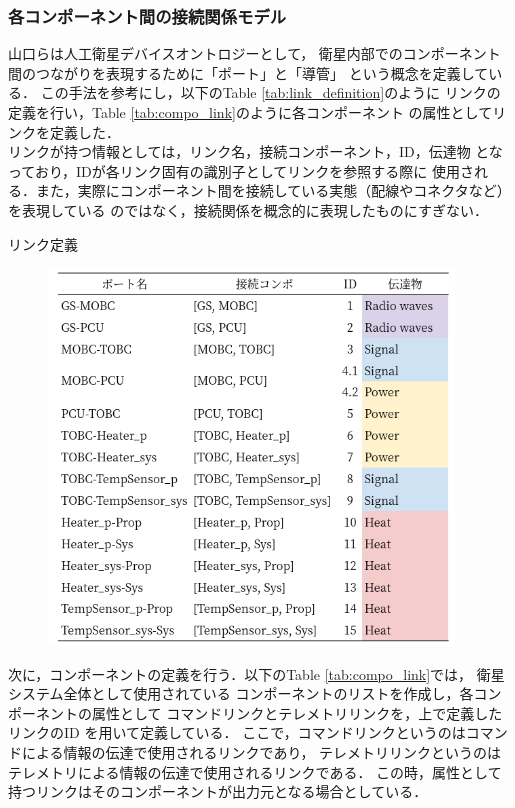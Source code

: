 \documentclass[11pt]{article}
\begin{document}
\subsubsection{各コンポーネント間の接続関係モデル}
山口ら\cite{Yamaguchi2014}は人工衛星デバイスオントロジーとして，
衛星内部でのコンポーネント間のつながりを表現するために「ポート」と「導管」%
という概念を定義している．
この手法を参考にし，以下のTable \ref{tab:link_definition}のように
リンクの定義を行い，Table \ref{tab:compo_link}のように各コンポーネント
の属性としてリンクを定義した．\\
リンクが持つ情報としては，リンク名，接続コンポーネント，ID，伝達物
となっており，IDが各リンク固有の識別子としてリンクを参照する際に
使用される．また，実際にコンポーネント間を接続している実態（配線やコネクタなど）を表現している
のではなく，接続関係を概念的に表現したものにすぎない．

\newpage
\begin{table}[H]
   \centering
   \caption{リンク定義} 
   \label{tab:link_definition}
\end{table} 
\vspace{-2zh}
\begin{figure}[H]
   \centering
      \includegraphics[height=10cm]{figure/port_definition.png}
\end{figure}
次に，コンポーネントの定義を行う．以下のTable \ref{tab:compo_link}では，
衛星システム全体として使用されている
コンポーネントのリストを作成し，各コンポーネントの属性として
コマンドリンクとテレメトリリンクを，上で定義したリンクのID
を用いて定義している．
ここで，コマンドリンクというのはコマンドによる情報の伝達で使用されるリンクであり，
テレメトリリンクというのはテレメトリによる情報の伝達で使用されるリンクである．
この時，属性として持つリンクはそのコンポーネントが出力元となる場合としている．
\end{document}
